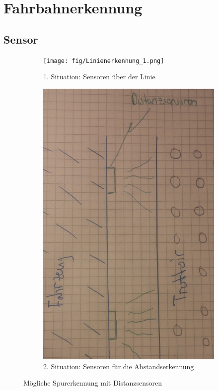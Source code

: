 
\section{Fahrbahnerkennung}


\subsection{Sensor}

\begin{figure} [hbp]
	\centering
	\begin{subfigure}[b]{0.39\textwidth}
		\texttt{[image: fig/Linienerkennung\_1.png]}
		\caption{1. Situation: Sensoren über der Linie}
	\end{subfigure}
	\hfill
	\begin{subfigure}[b]{0.35\textwidth}
		\includegraphics[width=\textwidth]{fig/Trottoirerkennung_1.png}
		\caption{2. Situation: Sensoren für die Abstandserkennung}
\end{subfigure}
	\caption{Mögliche Spurerkennung mit Distanzsensoren}\label{fig:SpurerkennungSensoren}
\end{figure}



